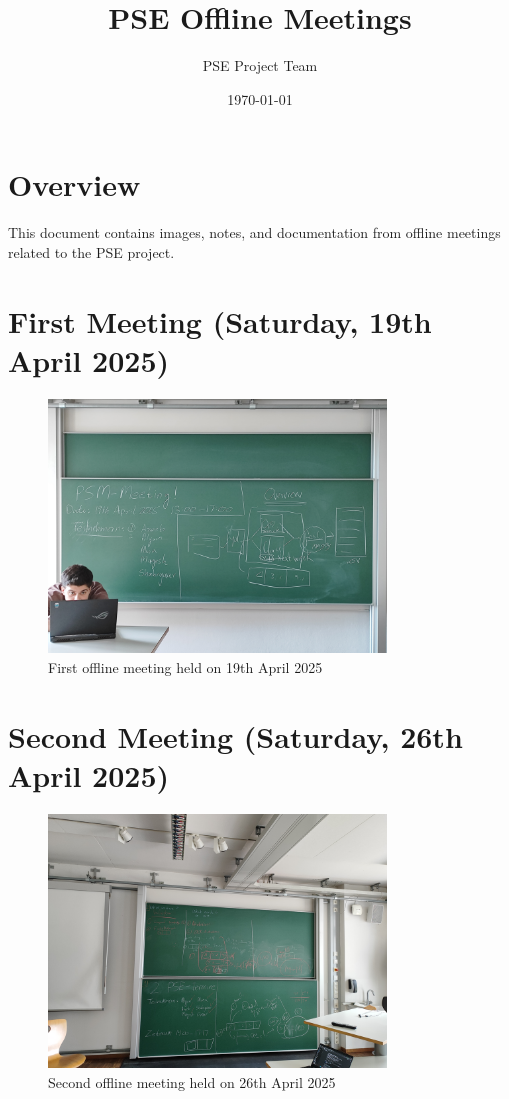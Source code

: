 \documentclass{article}
\title{PSE Offline Meetings}
\author{PSE Project Team}
\date{\today}
\begin{document}
\maketitle

\section*{Overview}

This document contains images, notes, and documentation from offline meetings related to the PSE project.

\section*{First Meeting (Saturday, 19th April 2025)}

\begin{figure}[H]
    \centering
    \includegraphics[width=0.8\textwidth]{images/Meeting1.jpg}
    \caption{First offline meeting held on 19th April 2025}
\end{figure}

\section*{Second Meeting (Saturday, 26th April 2025)}

\begin{figure}[H]
    \centering
    \includegraphics[width=0.8\textwidth]{images/Meeting2.jpg}
    \caption{Second offline meeting held on 26th April 2025}
\end{figure}
\end{document}
